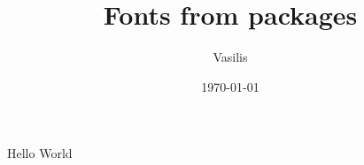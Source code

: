 \documentclass{article}
\title{{\calligra Fonts from packages}}
\author{{\unclfamily Vasilis}}
\date{\today}
\begin{document}
\maketitle

Hello {\ttfamily World}
\end{document}
